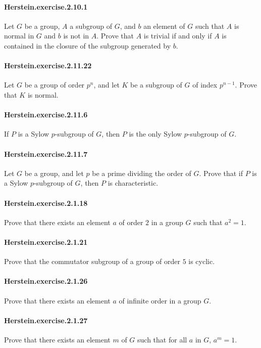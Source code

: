 \documentclass{article}
\begin{document}
\paragraph{Herstein.exercise.2.10.1} Let $G$ be a group, $A$ a subgroup of $G$, and $b$ an element of $G$ such that $A$ is normal in $G$ and $b$ is not in $A$. Prove that $A$ is trivial if and only if $A$ is contained in the closure of the subgroup generated by $b$.

\paragraph{Herstein.exercise.2.11.22} Let $G$ be a group of order $p^n$, and let $K$ be a subgroup of $G$ of index $p^{n-1}$. Prove that $K$ is normal.

\paragraph{Herstein.exercise.2.11.6} If $P$ is a Sylow $p$-subgroup of $G$, then $P$ is the only Sylow $p$-subgroup of $G$.

\paragraph{Herstein.exercise.2.11.7} Let $G$ be a group, and let $p$ be a prime dividing the order of $G$. Prove that if $P$ is a Sylow $p$-subgroup of $G$, then $P$ is characteristic.

\paragraph{Herstein.exercise.2.1.18} Prove that there exists an element $a$ of order $2$ in a group $G$ such that $a^2=1$.

\paragraph{Herstein.exercise.2.1.21} Prove that the commutator subgroup of a group of order $5$ is cyclic.

\paragraph{Herstein.exercise.2.1.26} Prove that there exists an element $a$ of infinite order in a group $G$.

\paragraph{Herstein.exercise.2.1.27} Prove that there exists an element $m$ of $G$ such that for all $a$ in $G$, $a^m=1$.
\end{document}
